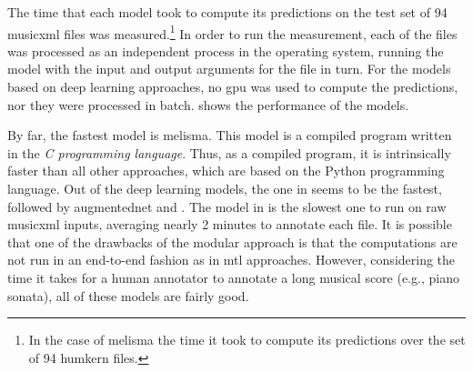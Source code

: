 
The time that each model took to compute its predictions on
the test set of 94 \gls{musicxml} files was
measured.\footnote{In the case of \gls{melisma} the time it
took to compute its predictions over the set of 94
\gls{humkern} files.} In order to run the measurement, each
of the files was processed as an independent process in the
operating system, running the model with the input and
output arguments for the file in turn. For the models based
on deep learning approaches, no \gls{gpu} was used to
compute the predictions, nor they were processed in batch.
 shows the performance of the
models.


By far, the fastest model is \gls{melisma}. This model is a
compiled program written in the \emph{C programming
language}. Thus, as a compiled program, it is intrinsically
faster than all other approaches, which are based on the
Python programming language. Out of the deep learning
models, the one in \textcite{micchi2021deep} seems to be the
fastest, followed by \gls{augmentednet} and
\textcite{chen2021attend}. The model in
\textcite{mcleod2021modular} is the slowest one to run on
raw \gls{musicxml} inputs, averaging nearly 2 minutes to
annotate each file. It is possible that one of the drawbacks
of the modular approach is that the computations are not run
in an end-to-end fashion as in \gls{mtl} approaches.
However, considering the time it takes for a human annotator
to annotate a long musical score (e.g., piano sonata), all
of these models are fairly good.
